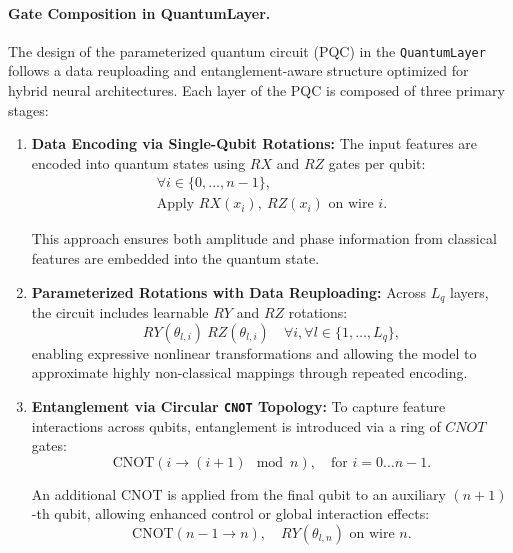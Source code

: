 \documentclass[conference]{IEEEtran}
\begin{document}
\paragraph{Gate Composition in QuantumLayer.}

The design of the parameterized quantum circuit (PQC) in the \texttt{QuantumLayer} follows a data reuploading and entanglement-aware structure optimized for hybrid neural architectures. Each layer of the PQC is composed of three primary stages:

\begin{enumerate}
    \item \textbf{Data Encoding via Single-Qubit Rotations:} The input features are encoded into quantum states using $RX$ and $RZ$ gates per qubit:
    \begin{multline}
    \forall i \in \{0, \dots, n-1\}, \quad \\ \text{Apply } RX(x_i),\ RZ(x_i) \text{ on wire } i.
    \end{multline}

    This approach ensures both amplitude and phase information from classical features are embedded into the quantum state.

    \item \textbf{Parameterized Rotations with Data Reuploading:} Across $L_q$ layers, the circuit includes learnable $RY$ and $RZ$ rotations:
    \begin{equation}
    RY(\theta_{l, i})\ RZ(\theta_{l, i}) \quad \forall i, \forall l \in \{1, \dots, L_q\},
    \end{equation}
    enabling expressive nonlinear transformations and allowing the model to approximate highly non-classical mappings through repeated encoding.

    \item \textbf{Entanglement via Circular \texttt{CNOT} Topology:} To capture feature interactions across qubits, entanglement is introduced via a ring of $CNOT$ gates:
    \begin{equation}
    \text{CNOT}(i \rightarrow (i+1) \mod n),\quad \text{for } i = 0 \dots n{-}1.
    \end{equation}

    An additional CNOT is applied from the final qubit to an auxiliary $(n+1)$-th qubit, allowing enhanced control or global interaction effects:
    \begin{equation}
    \text{CNOT}(n{-}1 \rightarrow n),\quad RY(\theta_{l, n}) \text{ on wire } n.
    \end{equation}
\end{enumerate}
\end{document}

